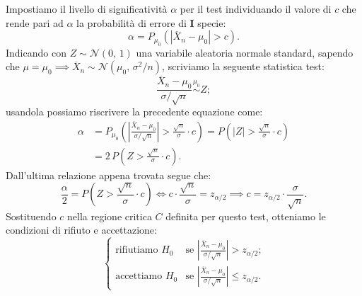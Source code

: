 \begin{defn}[Bilatero]
                Impostiamo il livello di significatività $\alpha$ per il test individuando il valore di $c$ 
                che rende pari ad $\alpha$ la probabilità di errore di $\mathbf{I}$ specie: \[
                    \alpha = P_{\mu_0}(|\overline{X}_n -\mu_0| > c)
                .\] Indicando con $Z\sim \mathcal{N}(0,\,1)$ una variabile aleatoria normale standard, sapendo 
                che $\mu = \mu_0 \implies \overline{X}_n \sim \mathcal{N}(\mu_0,\,\sigma^2 /n)$, scriviamo 
                la seguente statistica test: \[
                    \frac{\overline{X}_n -\mu_0}{\sigma /\sqrt{n}} \overset{\mu_0}{\sim} Z
                ;\] usandola possiamo riscrivere la precedente equazione come:
                \begin{align*}
                    \alpha &= P_{\mu_0}\left(\left|\frac{\overline{X}_n -\mu_0}{\sigma /\sqrt{n}}\right| 
                    > \frac{\sqrt{n}}{\sigma}\cdot c\right)
                    = P\left(|Z| > \frac{\sqrt{n}}{\sigma}\cdot c\right) \\
                    &= 2\,P\left(Z > \frac{\sqrt{n}}{\sigma}\cdot c\right)
                .\end{align*}
                Dall'ultima relazione appena trovata segue che: \[
                    \frac{\alpha}{2} = P\left(Z > \frac{\sqrt{n}}{\sigma}\cdot c\right)
                    \iff c \cdot\frac{\sqrt{n}}{\sigma} = z_{\alpha /2} \implies 
                    c = z_{\alpha /2}\cdot \frac{\sigma}{\sqrt{n}}
                .\] Sostituendo $c$ nella regione critica $C$ definita per questo test, otteniamo le condizioni 
                di rifiuto e accettazione: \[
                    \begin{cases}
                        \text{rifiutiamo } H_0 & 
                        \text{se $\left|\frac{\overline{X}_n -\mu_0}{\sigma /\sqrt{n}}\right| > z_{\alpha /2}$;} \\
                        \text{accettiamo } H_0 & 
                        \text{se $\left|\frac{\overline{X}_n -\mu_0}{\sigma /\sqrt{n}}\right| \leq z_{\alpha /2}$.}
                    \end{cases}
                \]
            \end{defn}
